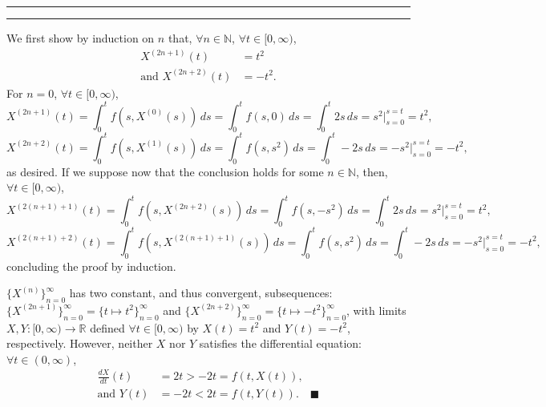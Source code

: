 \documentclass[11pt]{article}
\newcounter{questionCounter}
\newcounter{partCounter}[questionCounter]
\newenvironment{question}[2][\arabic{questionCounter}]{%
    \setcounter{partCounter}{0}%
    \vspace{.25in} \hrule \vspace{0.5em}%
        \noindent{\bf #2}%
    \vspace{0.8em} \hrule \vspace{.10in}%
    \addtocounter{questionCounter}{1}%
}{}
\newcommand{\mqed}{\quad \blacksquare}
\newcommand{\N}{\mathbb{N}} %
\newcommand{\R}{\mathbb{R}} %
\begin{document}
\newpage
\begin{question}{Problem 2}
We first show by induction on $n$ that, $\forall n \in \N$, $\forall t \in
[0,\infty)$,
\begin{align*}
X^{(2n + 1)}(t) & = t^2 \\
\mbox{and } X^{(2n + 2)}(t) & = -t^2.
\end{align*}
For $n = 0$, $\forall t \in [0,\infty)$,
\[X^{(2n + 1)}(t)
 = \int_0^t f(s,X^{(0)}(s)) \, ds
 = \int_0^t f(s,0) \, ds
 = \int_0^t 2s \, ds
 = s^2 \bigg|_{s = 0}^{s = t}
 = t^2,
\]
\[X^{(2n + 2)}(t)
 = \int_0^t f(s,X^{(1)}(s)) \, ds
 = \int_0^t f(s,s^2) \, ds
 = \int_0^t -2s \, ds
 = -s^2 \bigg|_{s = 0}^{s = t}
 = -t^2,
\]
as desired.
If we suppose now that the conclusion holds for some $n \in \N$, then,
$\forall t \in [0,\infty)$,
\[X^{(2(n + 1) + 1)}(t)
 = \int_0^t f(s,X^{(2n + 2)}(s)) \, ds
 = \int_0^t f(s,-s^2) \, ds
 = \int_0^t 2s \, ds
 = s^2 \bigg|_{s = 0}^{s = t}
 = t^2,
\]
\[X^{(2(n + 1) + 2)}(t)
 = \int_0^t f(s,X^{(2(n + 1) + 1)}(s)) \, ds
 = \int_0^t f(s,s^2) \, ds
 = \int_0^t -2s \, ds
 = -s^2 \bigg|_{s = 0}^{s = t}
 = -t^2,
\]
concluding the proof by induction.

$\{X^{(n)}\}_{n = 0}^{\infty}$ has two constant, and thus convergent,
subsequences:
$\{X^{(2n + 1)}\}_{n = 0}^{\infty} = \{t \mapsto t^2\}_{n = 0}^{\infty}$
and $\{X^{(2n + 2)}\}_{n = 0}^{\infty} = \{t \mapsto -t^2\}_{n = 0}^{\infty}$,
with limits $X,Y : [0,\infty) \rightarrow \R$ defined $\forall t \in
[0,\infty)$ by $X(t) = t^2$ and $Y(t) = -t^2$, respectively.
However, neither $X$ nor $Y$ satisfies the differential equation:
$\forall t \in (0,\infty)$,
\begin{align*}
\frac{dX}{dt}(t) & = 2t > -2t = f(t,X(t)), \\
\mbox{and } Y(t) & = -2t < 2t = f(t,Y(t)). \mqed
\end{align*}

\end{question}
\end{document}
